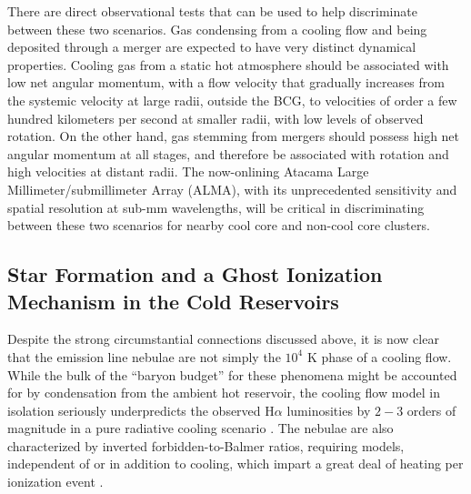 There are direct observational tests that can be used to help discriminate 
between these two scenarios. 
Gas condensing from a cooling flow and being deposited through a merger 
are expected to have very distinct dynamical properties. 
Cooling gas from a static hot atmosphere should be associated with low net angular momentum, 
with a flow velocity that gradually increases from the systemic velocity at large radii, outside the BCG, 
to velocities of order a few hundred kilometers per second at smaller radii, with low levels of observed 
rotation. On the other hand,  gas stemming from mergers should possess high net angular momentum at all stages, 
and therefore be associated with rotation and high velocities at distant radii. 
The now-onlining Atacama Large Millimeter/submillimeter Array (ALMA), with its unprecedented sensitivity and spatial resolution at sub-mm wavelengths, will be 
critical in discriminating between these two scenarios for nearby cool core and non-cool core clusters. 






\subsection{Star Formation and a Ghost Ionization Mechanism in the Cold Reservoirs }

Despite the strong circumstantial connections discussed above, 
it is now clear that the emission line nebulae 
are not simply the $10^4$ K phase of a cooling flow. 
While the bulk of the ``baryon budget'' for  these phenomena
might be accounted for by condensation from the ambient hot reservoir, 
the cooling flow model in isolation 
seriously underpredicts the observed H$\alpha$ luminosities by $2-3$ orders of magnitude
in a pure radiative cooling scenario \citep[e.g.,][]{heckman89,voit97}. 
The nebulae are also
characterized by inverted forbidden-to-Balmer ratios,  
requiring 
models, independent of or in addition to cooling, which impart a great deal of heating per ionization event \citep{donahue91,voit97}. 




